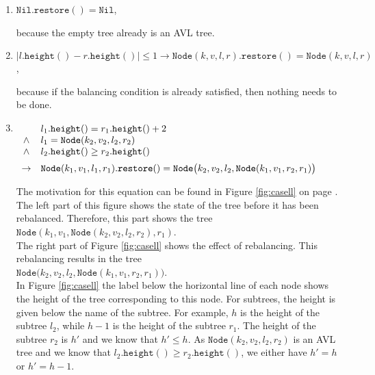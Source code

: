 \begin{enumerate}
\item $\mathtt{Nil}.\mathtt{restore}() = \mathtt{Nil}$,

      because the empty tree already is an  AVL tree.
\item $|l.\mathtt{height}() - r.\mathtt{height}()| \leq 1 \rightarrow 
       \mathtt{Node}(k,v,l,r).\mathtt{restore}() = \mathtt{Node}(k,v,l,r)$,

      because if the balancing condition is already satisfied, then nothing needs to be done. 
\item $\begin{array}[t]{cl}
              & l_1.\mathtt{height}() = r_1.\mathtt{height}() + 2    \\ 
       \wedge & l_1 = \mathtt{Node}(k_2,v_2,l_2,r_2)                 \\
       \wedge & l_2.\mathtt{height}() \geq r_2.\mathtt{height}()     \\[0.2cm]
       \rightarrow & \mathtt{Node}(k_1,v_1,l_1,r_1).\mathtt{restore}() = 
                     \mathtt{Node}\bigl(k_2,v_2,l_2,\mathtt{Node}(k_1,v_1,r_2,r_1)\bigr)
       \end{array}
      $

      The motivation for this equation can be found in Figure \ref{fig:casell}
      on page \pageref{fig:casell}.  The left part of this figure shows the state
      of the tree before it has been rebalanced.  Therefore, this part shows the tree
      \\[0.2cm]
      \hspace*{1.3cm}
      $\mathtt{Node}(k_1,v_1, \mathtt{Node}(k_2,v_2,l_2,r_2), r_1)$. 
      \\[0.2cm]
      The right part of Figure \ref{fig:casell} shows the effect of rebalancing.  
      This rebalancing results in the tree
      \\[0.2cm]
      \hspace*{1.3cm}
      $\mathtt{Node}\bigl(k_2,v_2,l_2,\mathtt{Node}(k_1,v_1,r_2,r_1)\bigr)$.
      \\[0.2cm]
      In Figure \ref{fig:casell} the label below the horizontal line of each node shows the height
      of the tree corresponding to this node.  For subtrees, the height is given below the name of
      the subtree.  For example,  $h$ is the height of the subtree 
      $l_2$, while $h-1$ is the height of the subtree $r_1$. The height of the subtree $r_2$
      is $h'$ and we know that $h' \leq h$.  As $\mathtt{Node}(k_2,v_2,l_2,r_2)$ is an AVL tree and we know that
      $l_2.\mathtt{height}() \geq r_2.\mathtt{height}()$, we
      either have $h' = h$ or $h' = h-1$.


\end{enumerate}
